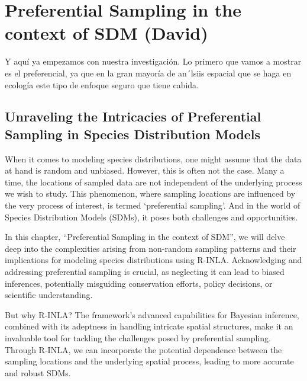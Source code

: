 \documentclass[
]{krantz}
\begin{document}
\pagebreak 
\setcounter{chapter}{6}
\setcounter{section}{0}
\renewcommand{\thepage}{\arabic{page}}

\hypertarget{preferential-sampling-in-the-context-of-sdm-david}{%
\chapter{Preferential Sampling in the context of SDM (David)}\label{preferential-sampling-in-the-context-of-sdm-david}}

Y aquí ya empezamos con nuestra investigación. Lo primero que vamos a mostrar es el preferencial, ya que en la gran mayoría de an´lsiis espacial que se haga en ecología este tipo de enfoque seguro que tiene cabida.

\hypertarget{unraveling-the-intricacies-of-preferential-sampling-in-species-distribution-models}{%
\section{Unraveling the Intricacies of Preferential Sampling in Species Distribution Models}\label{unraveling-the-intricacies-of-preferential-sampling-in-species-distribution-models}}

When it comes to modeling species distributions, one might assume that the data at hand is random and unbiased. However, this is often not the case. Many a time, the locations of sampled data are not independent of the underlying process we wish to study. This phenomenon, where sampling locations are influenced by the very process of interest, is termed `preferential sampling'. And in the world of Species Distribution Models (SDMs), it poses both challenges and opportunities.

In this chapter, ``Preferential Sampling in the context of SDM'', we will delve deep into the complexities arising from non-random sampling patterns and their implications for modeling species distributions using R-INLA. Acknowledging and addressing preferential sampling is crucial, as neglecting it can lead to biased inferences, potentially misguiding conservation efforts, policy decisions, or scientific understanding.

But why R-INLA? The framework's advanced capabilities for Bayesian inference, combined with its adeptness in handling intricate spatial structures, make it an invaluable tool for tackling the challenges posed by preferential sampling. Through R-INLA, we can incorporate the potential dependence between the sampling locations and the underlying spatial process, leading to more accurate and robust SDMs.
\end{document}
